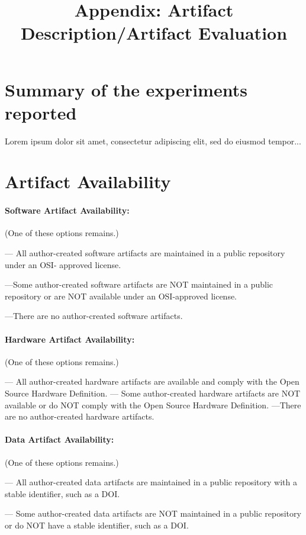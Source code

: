 \documentclass[sigconf,nonacm=true]{acmart}
\title{Appendix: Artifact Description/Artifact Evaluation}
\begin{document}
\maketitle

\section*{Summary of the experiments reported}

Lorem ipsum dolor sit amet, consectetur adipiscing elit, sed do eiusmod tempor...

\section*{Artifact Availability}

\paragraph{Software Artifact Availability:}  (One of these options remains.)

--- All author-created software artifacts are maintained in a public repository under an OSI- approved license.

---Some author-created software artifacts are NOT maintained in a public repository or are NOT available under an OSI-approved license.

---There are no author-created software artifacts.

\paragraph{Hardware Artifact Availability:}  (One of these options remains.)

--- All author-created hardware artifacts are available and comply with the Open Source Hardware Definition.
--- Some author-created hardware artifacts are NOT available or do NOT comply with the Open Source Hardware Definition.
---There are no author-created hardware artifacts.

\paragraph{Data Artifact Availability: }  (One of these options remains.)

--- All author-created data artifacts are maintained in a public repository with a stable identifier, such as a DOI.

--- Some author-created data artifacts are NOT maintained in a public repository or do NOT have a stable identifier, such as a DOI.
\end{document}
